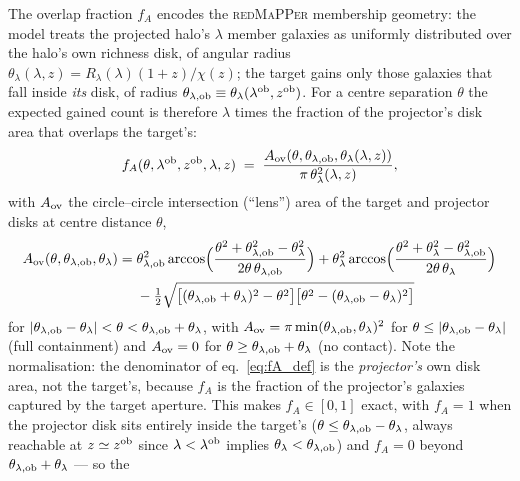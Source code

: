 \documentclass[a4paper, 11pt]{article}
\newcommand{\lob}{\lambda^{\rm ob}}
\newcommand{\zob}{z^{\rm ob}}
\begin{document}
The overlap fraction \(f_A\) encodes the \textsc{redMaPPer}
membership geometry: the model treats the projected halo's
\(\lambda\) member galaxies as uniformly distributed over the
halo's own richness disk, of angular radius
\(\theta_\lambda(\lambda,z) = R_\lambda(\lambda)(1+z)/\chi(z)\);
the target gains only those galaxies that fall inside \emph{its}
disk, of radius
\(\theta_{\lambda,{\rm ob}} \equiv \theta_\lambda(\lob,\zob)\).
For a centre separation \(\theta\) the expected gained count is
therefore \(\lambda\) times the fraction of the projector's disk
area that overlaps the target's:
\begin{equation}
f_A(\theta,\lob,\zob,\lambda,z)
\;=\;
\frac{A_{\rm ov}(\theta,\theta_{\lambda,{\rm ob}},\theta_\lambda(\lambda,z))}
     {\pi\,\theta_\lambda^2(\lambda,z)},
\label{eq:fA_def}
\end{equation}
with \(A_{\rm ov}\) the circle--circle intersection (``lens'')
area of the target and projector disks at centre distance
\(\theta\),
\begin{align}
A_{\rm ov}(\theta,\theta_{\lambda,{\rm ob}},\theta_\lambda)
=\;& \theta_{\lambda,{\rm ob}}^2
\arccos\!\Big(\frac{\theta^2+\theta_{\lambda,{\rm ob}}^2
                     -\theta_\lambda^2}{2\theta\,\theta_{\lambda,{\rm ob}}}\Big)
+ \theta_\lambda^2
\arccos\!\Big(\frac{\theta^2+\theta_\lambda^2
                     -\theta_{\lambda,{\rm ob}}^2}{2\theta\,\theta_\lambda}\Big)
\notag\\
&- \tfrac12\sqrt{\big[(\theta_{\lambda,{\rm ob}}+\theta_\lambda)^2-\theta^2\big]
                 \big[\theta^2-(\theta_{\lambda,{\rm ob}}-\theta_\lambda)^2\big]}
\label{eq:A_ov}
\end{align}
for \(|\theta_{\lambda,{\rm ob}}-\theta_\lambda|<\theta
<\theta_{\lambda,{\rm ob}}+\theta_\lambda\), with
\(A_{\rm ov}=\pi\min(\theta_{\lambda,{\rm ob}},\theta_\lambda)^2\)
for \(\theta\le|\theta_{\lambda,{\rm ob}}-\theta_\lambda|\)
(full containment) and \(A_{\rm ov}=0\) for
\(\theta\ge\theta_{\lambda,{\rm ob}}+\theta_\lambda\) (no contact).
Note the normalisation: the denominator of eq.~\eqref{eq:fA_def}
is the \emph{projector's} own disk area, not the target's, because
\(f_A\) is the fraction of the projector's galaxies captured by
the target aperture. This makes \(f_A\in[0,1]\) exact, with
\(f_A=1\) when the projector disk sits entirely inside the
target's (\(\theta \le \theta_{\lambda,{\rm ob}}-\theta_\lambda\),
always reachable at \(z\simeq\zob\) since \(\lambda<\lob\) implies
\(\theta_\lambda<\theta_{\lambda,{\rm ob}}\)) and \(f_A=0\) beyond
\(\theta_{\lambda,{\rm ob}}+\theta_\lambda\) --- so the
\end{document}
